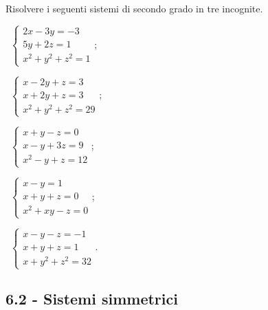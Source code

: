 \begin{esercizio}[\Ast]
 \label{ese:6.13}
Risolvere i seguenti sistemi di secondo grado in tre incognite.
\begin{multicols}{2}
 \begin{enumeratea}
 \item~$\left\{\begin{array}{l}2x-3y=-3\\5y+2z=1\\x^2+y^2+z^2=1\end{array}\right.$;
 \item~$\left\{\begin{array}{l}x-2y+z=3\\x+2y+z=3\\x^2+y^2+z^2=29\end{array}\right.$;
 \item~$\left\{\begin{array}{l}x+y-z=0\\x-y+3z=9\\x^2-y+z=12\end{array}\right.$;
 \item~$\left\{\begin{array}{l}x-y=1\\x+y+z=0\\x^2+xy-z=0\end{array}\right.$;
 \item~$\left\{\begin{array}{l}x-y-z=-1\\x+y+z=1\\x+y^2+z^2=32\end{array}\right.$.
 \end{enumeratea}
 \end{multicols}
\end{esercizio}

\subsection*{6.2 - Sistemi simmetrici}


